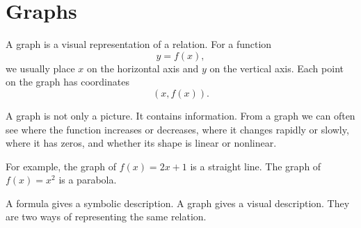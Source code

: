 \section{Graphs}

A graph is a visual representation of a relation. For a function
\[
y=f(x),
\]
we usually place \(x\) on the horizontal axis and \(y\) on the vertical axis. Each point on the graph has coordinates
\[
(x,f(x)).
\]

\begin{center}
\end{center}

A graph is not only a picture. It contains information. From a graph we can often see where the function increases or decreases, where it changes rapidly or slowly, where it has zeros, and whether its shape is linear or nonlinear.

For example, the graph of \(f(x)=2x+1\) is a straight line. The graph of \(f(x)=x^2\) is a parabola.

\begin{summarybox}
A formula gives a symbolic description. A graph gives a visual description. They are two ways of representing the same relation.
\end{summarybox}
